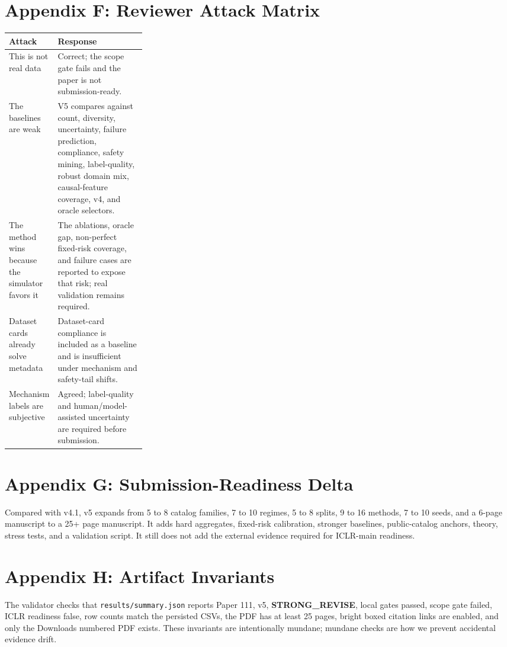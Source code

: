 \documentclass{article}
\begin{document}
\section{Appendix F: Reviewer Attack Matrix}
\begin{tabularx}{\linewidth}{p{0.27\linewidth}X}
\toprule
Attack & Response \\
\midrule
This is not real data & Correct; the scope gate fails and the paper is not submission-ready. \\
The baselines are weak & V5 compares against count, diversity, uncertainty, failure prediction, compliance, safety mining, label-quality, robust domain mix, causal-feature coverage, v4, and oracle selectors. \\
The method wins because the simulator favors it & The ablations, oracle gap, non-perfect fixed-risk coverage, and failure cases are reported to expose that risk; real validation remains required. \\
Dataset cards already solve metadata & Dataset-card compliance is included as a baseline and is insufficient under mechanism and safety-tail shifts. \\
Mechanism labels are subjective & Agreed; label-quality and human/model-assisted uncertainty are required before submission. \\
\bottomrule
\end{tabularx}

\section{Appendix G: Submission-Readiness Delta}
Compared with v4.1, v5 expands from 5 to 8 catalog families, 7 to 10 regimes, 5 to 8 splits, 9 to 16 methods, 7 to 10 seeds, and a 6-page manuscript to a 25+ page manuscript. It adds hard aggregates, fixed-risk calibration, stronger baselines, public-catalog anchors, theory, stress tests, and a validation script. It still does not add the external evidence required for ICLR-main readiness.

\section{Appendix H: Artifact Invariants}
The validator checks that \texttt{results/summary.json} reports Paper 111, v5, \textbf{STRONG\_REVISE}, local gates passed, scope gate failed, ICLR readiness false, row counts match the persisted CSVs, the PDF has at least 25 pages, bright boxed citation links are enabled, and only the Downloads numbered PDF exists. These invariants are intentionally mundane; mundane checks are how we prevent accidental evidence drift.
\end{document}
